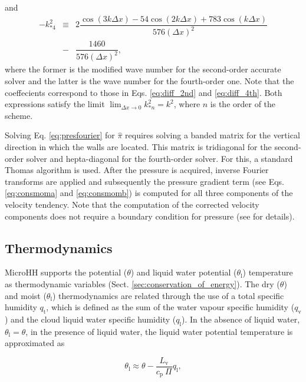 \documentclass[gmd,manuscript]{copernicus}
\begin{document}
and
\begin{eqnarray}
\nonumber
-k_{*4}^2 & \equiv & 2 \dfrac{\cos (3k \Delta x) - 54 \cos (2k \Delta x) + 783 \cos (k \Delta x)}
{576 \left( \Delta x \right)^2}\\
& - & \dfrac{1460}{576 \left( \Delta x \right)^2},
\end{eqnarray}
where the former is the modified wave number for the second-order accurate solver and the latter is the wave number for the fourth-order one. Note that the coeffecients correspond to those in Eqs. \ref{eq:diff_2nd} and \ref{eq:diff_4th}. Both expressions satisfy the limit $\lim_{\Delta x \rightarrow 0} k_{*n}^2 = k^2$, where $n$ is the order of the scheme.

Solving Eq. \ref{eq:presfourier} for $\widehat{\pi}$ requires solving a banded matrix for the vertical direction in which the walls are located. This matrix is tridiagonal for the second-order solver and hepta-diagonal for the fourth-order solver. For this, a standard Thomas algorithm \citep{Thomas1949} is used. After the pressure is acquired, inverse Fourier transforms are applied and subsequently the pressure gradient term (see Eqs. \ref{eq:consmoma} and \ref{eq:consmomb}) is computed for all three components of the velocity tendency. Note that the computation of the corrected velocity components does not require a boundary condition for pressure (see \citet{Vreman2014} for details).

\subsection{Thermodynamics}\label{sec:thermo}
MicroHH supports the potential  ($\theta$) and liquid water potential ($\theta_\mathrm{l}$) temperature as thermodynamic variables (Sect. \ref{sec:conservation_of_energy}). The dry ($\theta$) and moist ($\theta_\mathrm{l}$) thermodynamics are related through the use of a total specific humidity $q_\mathrm{t}$, which is defined as the sum of the water vapour specific humidity ($q_\mathrm{v}$) and the cloud liquid water specific humidity ($q_\mathrm{l}$). In the absence of liquid water, $\theta_\mathrm{l} = \theta$, in the presence of liquid water, the liquid water potential temperature is approximated as \citep{Betts1973}

\begin{equation}
\theta_\mathrm{l} \approx \theta - \frac{L_\mathrm{v}}{c_\mathrm{p} ~ \Pi} q_\mathrm{l}, 	
\end{equation}
\end{document}
